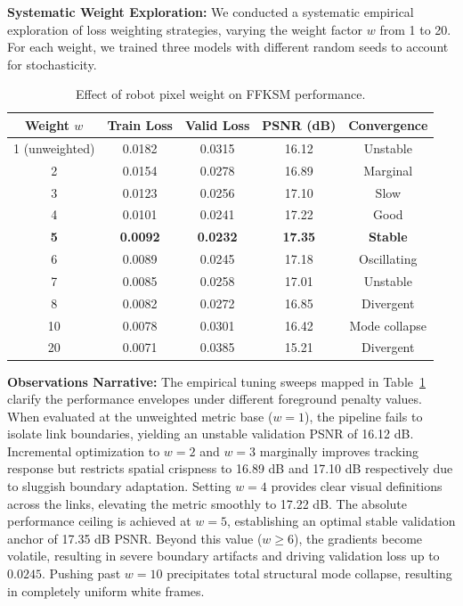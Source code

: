 \documentclass[12pt,a4paper,oneside]{report}
\begin{document}
\textbf{Systematic Weight Exploration:}
We conducted a systematic empirical exploration of loss weighting strategies, varying the weight factor $w$ from 1 to 20. For each weight, we trained three models with different random seeds to account for stochasticity.

\begin{table}[H]
\centering
\caption{Effect of robot pixel weight on FFKSM performance.}
\label{tab:weight_tuning}
\begin{tabular}{ccccc}
\toprule
Weight $w$ & Train Loss & Valid Loss & PSNR (dB) & Convergence \\
\midrule
1 (unweighted) & 0.0182 & 0.0315 & 16.12 & Unstable \\
2 & 0.0154 & 0.0278 & 16.89 & Marginal \\
3 & 0.0123 & 0.0256 & 17.10 & Slow \\
4 & 0.0101 & 0.0241 & 17.22 & Good \\
\textbf{5} & \textbf{0.0092} & \textbf{0.0232} & \textbf{17.35} & \textbf{Stable} \\
6 & 0.0089 & 0.0245 & 17.18 & Oscillating \\
7 & 0.0085 & 0.0258 & 17.01 & Unstable \\
8 & 0.0082 & 0.0272 & 16.85 & Divergent \\
10 & 0.0078 & 0.0301 & 16.42 & Mode collapse \\
20 & 0.0071 & 0.0385 & 15.21 & Divergent \\
\bottomrule
\end{tabular}
\end{table}

\textbf{Observations Narrative:}
The empirical tuning sweeps mapped in Table~\ref{tab:weight_tuning} clarify the performance envelopes under different foreground penalty values. When evaluated at the unweighted metric base ($w=1$), the pipeline fails to isolate link boundaries, yielding an unstable validation PSNR of 16.12 dB. Incremental optimization to $w=2$ and $w=3$ marginally improves tracking response but restricts spatial crispness to 16.89 dB and 17.10 dB respectively due to sluggish boundary adaptation. Setting $w=4$ provides clear visual definitions across the links, elevating the metric smoothly to 17.22 dB. The absolute performance ceiling is achieved at $w=5$, establishing an optimal stable validation anchor of 17.35 dB PSNR. Beyond this value ($w \ge 6$), the gradients become volatile, resulting in severe boundary artifacts and driving validation loss up to $0.0245$. Pushing past $w=10$ precipitates total structural mode collapse, resulting in completely uniform white frames.
\end{document}
